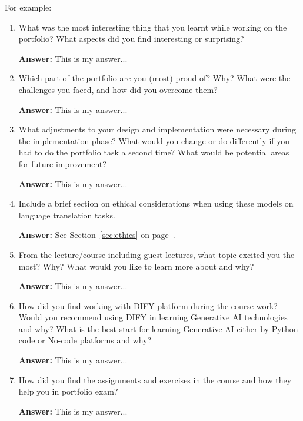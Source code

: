 For example:
\begin{enumerate}
    \item   What was the most interesting thing that you learnt while working on the portfolio?
            What aspects did you find interesting or surprising? 
    
    \textbf{Answer:}
    This is my answer...
    
    \item   Which part of the portfolio are you (most) proud of?
            Why?
            What were the challenges you faced, and how did you overcome them? 

    \textbf{Answer:}
    This is my answer...

    \item   What adjustments to your design and implementation were necessary during the implementation phase?
            What would you change or do differently if you had to do the portfolio task a second time?
            What would be potential areas for future improvement?
    
    \textbf{Answer:}
    This is my answer...

    \item   Include a brief section on ethical considerations when using these models on language translation tasks.
    
    \textbf{Answer:}
    See Section~\ref{sec:ethics} on page~\pageref{sec:ethics}.

    \item   From the lecture/course including guest lectures, what topic excited you the most?
            Why?
            What would you like to learn more about and why?
    
    \textbf{Answer:}
    This is my answer...

    \item   How did you find working with DIFY platform during the course work?
            Would you recommend using DIFY in learning Generative AI technologies and why?
            What is the best start for learning Generative AI either by Python code or No-code platforms and why?
    
    \textbf{Answer:}
    This is my answer...

    \item   How did you find the assignments and exercises in the course and how they help you in portfolio exam?
    
    \textbf{Answer:}
    This is my answer...
    
\end{enumerate}

